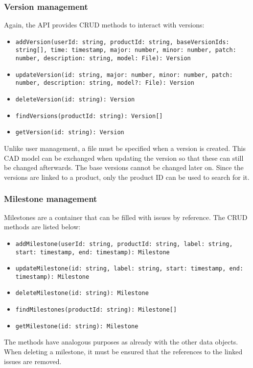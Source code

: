     \subsubsection*{Version management}
    Again, the API provides CRUD methods to interact with versions:
    \begin{itemize}
        \item \texttt{addVersion(userId: string, productId: string, baseVersionIds: string[], time: timestamp, major: number, minor: number, patch: number, description: string, model: File): Version}
        \item \texttt{updateVersion(id: string, major: number, minor: number, patch: number, description: string, model?: File): Version}
        \item \texttt{deleteVersion(id: string): Version}
        \item \texttt{findVersions(productId: string): Version[]}
        \item \texttt{getVersion(id: string): Version}
    \end{itemize}
    Unlike user management, a file must be specified when a version is created. 
    This CAD model can be exchanged when updating the version so that these can still be changed afterwards. The base versions cannot be changed later on.
    Since the versions are linked to a product, only the product ID can be used to search for it.

    \subsubsection*{Milestone management}
    Milestones are a container that can be filled with issues by reference. The CRUD methods are listed below:
    \begin{itemize}
        \item \texttt{addMilestone(userId: string, productId: string, label: string, start: timestamp, end: timestamp): Milestone}
        \item \texttt{updateMilestone(id: string, label: string, start: timestamp, end: timestamp): Milestone}
        \item \texttt{deleteMilestone(id: string): Milestone}
        \item \texttt{findMilestones(productId: string): Milestone[]}
        \item \texttt{getMilestone(id: string): Milestone}
    \end{itemize}
    The methods have analogous purposes as already with the other data objects. When deleting a milestone, it must be ensured that the references to the linked issues are removed.


